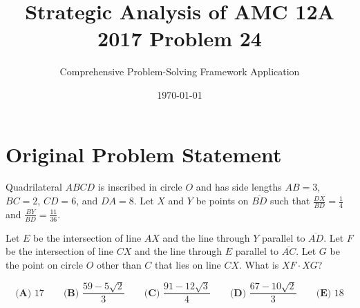 \documentclass[]{article}
\begin{document}
\title{\textbf{Strategic Analysis of AMC 12A 2017 Problem 24}}
\author{Comprehensive Problem-Solving Framework Application}
\date{\today}
\maketitle

\section*{Original Problem Statement}
Quadrilateral $ABCD$ is inscribed in circle $O$ and has side lengths $AB=3$, $BC=2$, $CD=6$, and $DA=8$. Let $X$ and $Y$ be points on $\overline{BD}$ such that $\frac{DX}{BD} = \frac{1}{4}$ and $\frac{BY}{BD} = \frac{11}{36}$.

Let $E$ be the intersection of line $AX$ and the line through $Y$ parallel to $\overline{AD}$. Let $F$ be the intersection of line $CX$ and the line through $E$ parallel to $\overline{AC}$. Let $G$ be the point on circle $O$ other than $C$ that lies on line $CX$. What is $XF \cdot XG$?

\[\textbf{(A) }17\qquad\textbf{(B) }\frac{59 - 5\sqrt{2}}{3}\qquad\textbf{(C) }\frac{91 - 12\sqrt{3}}{4}\qquad\textbf{(D) }\frac{67 - 10\sqrt{2}}{3}\qquad\textbf{(E) }18\]

\newpage
\end{document}
